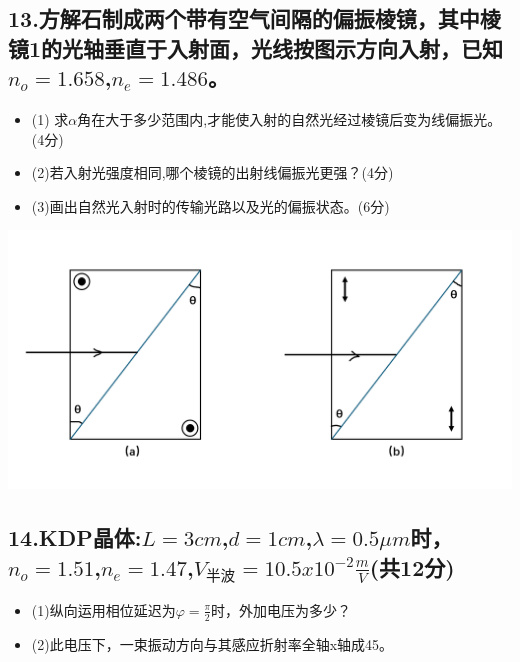 \documentclass[11pt,a4paper]{article}
\begin{document}
    \subsection*{13.方解石制成两个带有空气间隔的偏振棱镜，其中棱镜1的光轴垂直于入射面，光线按图示方向入射，已知$n_o=1.658$,$n_e=1.486$。}
    \begin{itemize}
        \vspace{-3mm}
        \item (1) 求$\alpha $角在大于多少范围内,才能使入射的自然光经过棱镜后变为线偏振光。(4分)
        \vspace{-3mm}
        \item (2)若入射光强度相同,哪个棱镜的出射线偏振光更强？(4分)
        \vspace{-3mm}
        \item (3)画出自然光入射时的传输光路以及光的偏振状态。(6分)
    \end{itemize}
    \vspace{-3mm}
    \includegraphics[scale=0.2]{7.png}%
    \subsection*{14.KDP晶体:$L=3cm$,$d=1cm$,$\lambda =0.5\mu m$时，$n_o=1.51$,$n_e=1.47$,$V_\text{半波}=10.5x10^{-2} \frac{m}{V}$(共12分)}
    \begin{itemize}
        \vspace{-3mm}
        \item (1)纵向运用相位延迟为$\varphi = \frac{\pi}{2}$时，外加电压为多少？
        \vspace{-3mm}
        \item (2)此电压下，一束振动方向与其感应折射率全轴x轴成45。
    \end{itemize}
    \vspace{-3mm}
\end{document}
